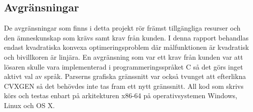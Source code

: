 \subsection{Avgränsningar}
De avgränsningar som finns i detta projekt rör främst tillgängliga resurser och den ämneskunskap som krävs samt krav från kunden.
\newline
\newline
I denna rapport behandlas endast kvadratiska konvexa optimeringsproblem där målfunktionen är kvadratisk och bivillkoren är linjära. En avgränsning som var ett krav från kunden var att lösaren skulle vara implementerad i programmeringsspråket C så det görs inget aktivt val av språk. Parserns grafiska gränssnitt var också tvunget att efterlikna CVXGEN så det behövdes inte tas fram ett nytt gränssnitt. 
\newline
\newline
All kod som skrivs körs och testas enbart på arkitekturen x86-64 på operativsystemen Windows, Linux och OS X.
